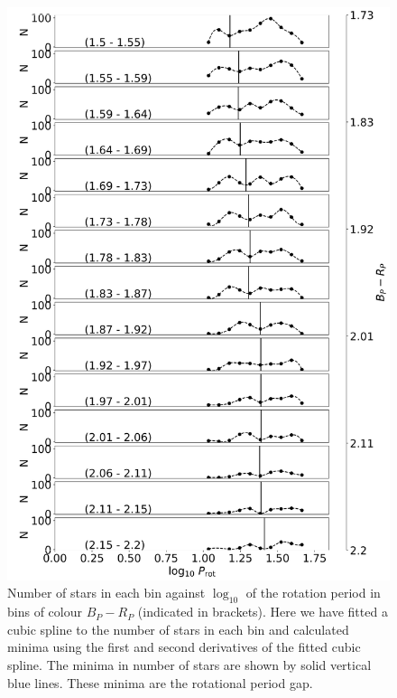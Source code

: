 \begin{figure}
\centering
    \includegraphics[width=\textwidth]{Figures/rot_gap_figures/n_col.png}
    \caption{
    	Number of stars in each bin against $\log_10$ of the rotation period in bins of colour \gaia{} $B_P-R_P$ (indicated in brackets). Here we have fitted a cubic spline to the number of stars in each bin and calculated minima using the first and second derivatives of the fitted cubic spline. The minima in number of stars are shown by solid vertical blue lines. These minima are the rotational period gap.
}
    \label{fig:n_col}
\end{figure}


